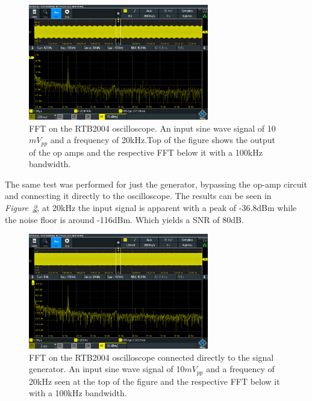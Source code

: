 \begin{figure}[h]
    \centering
    \includegraphics[width=0.7\textwidth]{graphics/Noise20k10mVpp100kband.PNG}
    \caption{FFT on the RTB2004 oscilloscope. An input sine wave signal of 10$mV_{pp}$ and a frequency of 20kHz.Top of the figure shows the output of the op amps and the respective FFT below it with a 100kHz bandwidth.}
    \label{fig:Noise20k10mVpp100kband}
\end{figure}





The same test was performed for just the generator, bypassing the op-amp circuit and connecting it directly to the oscilloscope.
The results can be seen in \textit{Figure~\ref{fig:NoiseGenerator20kInp100kBand}}, at 20kHz the input signal is apparent with a peak of -36.8dBm while the noise floor is around -116dBm.
Which yields a SNR of 80dB.

\begin{figure}[h]
    \centering
    \includegraphics[width=0.7\textwidth]{graphics/NoiseGenerator20kInp100kBand.PNG}
    \caption{FFT on the RTB2004 oscilloscope connected directly to the signal generator. 
    An input sine wave signal of 10$mV_{pp}$ and a frequency of 20kHz seen at the top of the figure and the respective FFT below it with a 100kHz bandwidth.}
    \label{fig:NoiseGenerator20kInp100kBand}
\end{figure}

